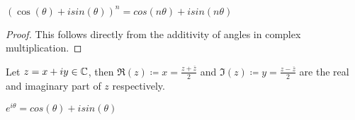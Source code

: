 \begin{corollary}
    $(\cos(\theta) + i sin(\theta))^n = cos(n \theta) + i sin(n \theta)$
\end{corollary}

\begin{proof}
    This follows directly from the additivity of angles in complex multiplication.
\end{proof}

\begin{definition}
    Let $z = x + iy \in \mathbb{C}$, then $\Re(z) \coloneqq x = \frac{z + \overline{z}}{2}$ and $\Im(z) \coloneqq y = \frac{z - \overline{z}}{2}$ are the real and imaginary part of $z$ respectively.
\end{definition}

\begin{theorem}
    $e^{i \theta} = cos(\theta) + i sin(\theta)$
\end{theorem}